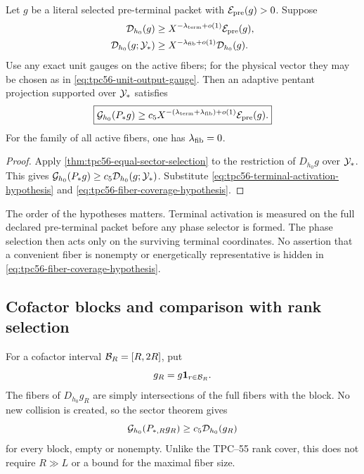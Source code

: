 \begin{corollary}
\label{cor:tpc56-activation-coverage-transfer}
Let \(g\) be a literal selected pre-terminal packet with
\(\mathcal E_{\rm pre}(g)>0\).  Suppose
\begin{align}
 \mathcal D_{h_0}(g)
 &\ge X^{-\lambda_{\rm term}+o(1)}\mathcal E_{\rm pre}(g),
 \label{eq:tpc56-terminal-activation-hypothesis}\\
 \mathcal D_{h_0}(g;\mathcal Y_*)
 &\ge X^{-\lambda_{\rm fib}+o(1)}\mathcal D_{h_0}(g).
 \label{eq:tpc56-fiber-coverage-hypothesis}
\end{align}
Use any exact unit gauges on the active fibers; for the physical vector
they may be chosen as in \eqref{eq:tpc56-unit-output-gauge}.  Then an
adaptive pentant projection supported over \(\mathcal Y_*\) satisfies
\begin{equation}
 \boxed{
 \mathcal G_{h_0}(P_*g)
 \ge c_5X^{-(\lambda_{\rm term}+\lambda_{\rm fib})+o(1)}
 \mathcal E_{\rm pre}(g).}
 \label{eq:tpc56-activation-sector-transfer}
\end{equation}
For the family of all active fibers, one has \(\lambda_{\rm fib}=0\).
\end{corollary}

\begin{proof}
Apply \cref{thm:tpc56-equal-sector-selection} to the restriction of
\(D_{h_0}g\) over \(\mathcal Y_*\).  This gives
\(\mathcal G_{h_0}(P_*g)\ge c_5\mathcal D_{h_0}(g;\mathcal Y_*)\).  Substitute
\eqref{eq:tpc56-terminal-activation-hypothesis} and
\eqref{eq:tpc56-fiber-coverage-hypothesis}.
\end{proof}

The order of the hypotheses matters.  Terminal activation is measured on
the full declared pre-terminal packet before any phase selector is formed.
The phase selection then acts only on the surviving terminal coordinates.
No assertion that a convenient fiber is nonempty or energetically
representative is hidden in \eqref{eq:tpc56-fiber-coverage-hypothesis}.

\subsection{Cofactor blocks and comparison with rank selection}

For a cofactor interval \(\mathcal B_R=[R,2R]\), put
\begin{equation}
 g_R=g\mathbf 1_{r\in\mathcal B_R}.
 \label{eq:tpc56-cofactor-block}
\end{equation}
The fibers of \(D_{h_0}g_R\) are simply intersections of the full fibers
with the block.  No new collision is created, so the sector theorem gives
\begin{equation}
 \mathcal G_{h_0}(P_{*,R}g_R)
 \ge c_5\mathcal D_{h_0}(g_R)
 \label{eq:tpc56-block-sector-lower}
\end{equation}
for every block, empty or nonempty.  Unlike the TPC--55 rank cover, this
does not require \(R\gg L\) or a bound for the maximal fiber size.

